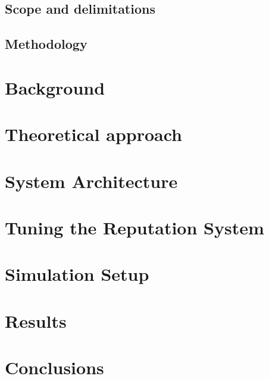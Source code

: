 \documentclass[a4paper,11pt]{kth-mag}
\begin{document}
\subsection{Scope and delimitations}

\subsection{Methodology}


\section{Background}


\section{Theoretical approach}

\section{System Architecture}

\section{Tuning the Reputation System}

\section{Simulation Setup}

\section{Results}

\section{Conclusions}

\
\begin{comment}
\begin{figure}[ht]
\begin{center}
And here is a figure
\caption{\small{Several statements describing the same resource.}}\label{RDF_4}
\end{center}
\end{figure}


that we refer to here: \ref{RDF_4}
\end{comment}
\printbibliography
\end{document}
